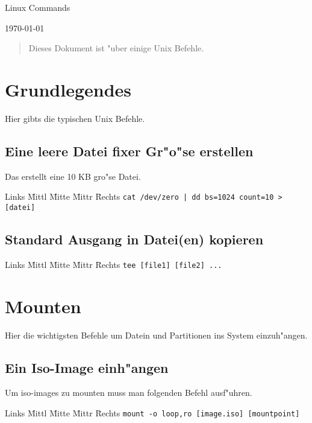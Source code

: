 \documentclass[12pt]{article}
\newenvironment{code}{\begin{tabbing}Links \= Mittl \= Mitte \= Mittr \= Rechts \kill}{\end{tabbing}}
\begin{document}
\pagestyle{empty}

\label{cover_page}

\begin{center}
	\huge{Linux Commands\\}
\end{center}

\begin{center}
	\today
\end{center}

\begin{abstract}
	\label{the_abstract}
	Dieses Dokument ist "uber einige Unix Befehle.
\end{abstract}
\newpage

\tableofcontents

\newpage
\section{Grundlegendes}
Hier gibts die typischen Unix Befehle.
\subsection{Eine leere Datei fixer Gr"o"se erstellen}
Das erstellt eine 10 KB gro"se Datei.
\begin{code}
	\> \verb#cat /dev/zero | dd bs=1024 count=10 > [datei]#
\end{code}
\subsection{Standard Ausgang in Datei(en) kopieren}
\begin{code}
	\> \verb#tee [file1] [file2] ...#
\end{code}

\section{Mounten}
Hier die wichtigsten Befehle um Datein und Partitionen ins System einzuh"angen.
\subsection{Ein Iso-Image einh"angen}
Um iso-images zu mounten muss man folgenden Befehl ausf"uhren.
\begin{code}
	\> \verb#mount -o loop,ro [image.iso] [mountpoint]#
\end{code}
\end{document}
